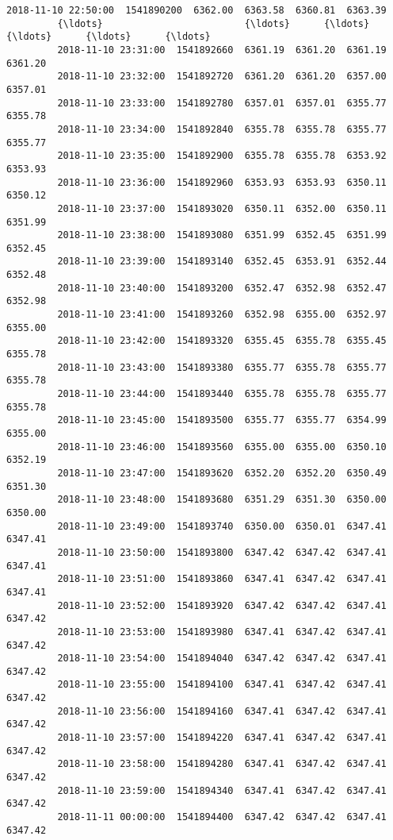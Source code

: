 \documentclass[11pt]{article}
\begin{document}
\begin{Verbatim}[commandchars=\\\{\}]
         2018-11-10 22:50:00  1541890200  6362.00  6363.58  6360.81  6363.39   
         {\ldots}                         {\ldots}      {\ldots}      {\ldots}      {\ldots}      {\ldots}   
         2018-11-10 23:31:00  1541892660  6361.19  6361.20  6361.19  6361.20   
         2018-11-10 23:32:00  1541892720  6361.20  6361.20  6357.00  6357.01   
         2018-11-10 23:33:00  1541892780  6357.01  6357.01  6355.77  6355.78   
         2018-11-10 23:34:00  1541892840  6355.78  6355.78  6355.77  6355.77   
         2018-11-10 23:35:00  1541892900  6355.78  6355.78  6353.92  6353.93   
         2018-11-10 23:36:00  1541892960  6353.93  6353.93  6350.11  6350.12   
         2018-11-10 23:37:00  1541893020  6350.11  6352.00  6350.11  6351.99   
         2018-11-10 23:38:00  1541893080  6351.99  6352.45  6351.99  6352.45   
         2018-11-10 23:39:00  1541893140  6352.45  6353.91  6352.44  6352.48   
         2018-11-10 23:40:00  1541893200  6352.47  6352.98  6352.47  6352.98   
         2018-11-10 23:41:00  1541893260  6352.98  6355.00  6352.97  6355.00   
         2018-11-10 23:42:00  1541893320  6355.45  6355.78  6355.45  6355.78   
         2018-11-10 23:43:00  1541893380  6355.77  6355.78  6355.77  6355.78   
         2018-11-10 23:44:00  1541893440  6355.78  6355.78  6355.77  6355.78   
         2018-11-10 23:45:00  1541893500  6355.77  6355.77  6354.99  6355.00   
         2018-11-10 23:46:00  1541893560  6355.00  6355.00  6350.10  6352.19   
         2018-11-10 23:47:00  1541893620  6352.20  6352.20  6350.49  6351.30   
         2018-11-10 23:48:00  1541893680  6351.29  6351.30  6350.00  6350.00   
         2018-11-10 23:49:00  1541893740  6350.00  6350.01  6347.41  6347.41   
         2018-11-10 23:50:00  1541893800  6347.42  6347.42  6347.41  6347.41   
         2018-11-10 23:51:00  1541893860  6347.41  6347.42  6347.41  6347.41   
         2018-11-10 23:52:00  1541893920  6347.42  6347.42  6347.41  6347.42   
         2018-11-10 23:53:00  1541893980  6347.41  6347.42  6347.41  6347.42   
         2018-11-10 23:54:00  1541894040  6347.42  6347.42  6347.41  6347.42   
         2018-11-10 23:55:00  1541894100  6347.41  6347.42  6347.41  6347.42   
         2018-11-10 23:56:00  1541894160  6347.41  6347.42  6347.41  6347.42   
         2018-11-10 23:57:00  1541894220  6347.41  6347.42  6347.41  6347.42   
         2018-11-10 23:58:00  1541894280  6347.41  6347.42  6347.41  6347.42   
         2018-11-10 23:59:00  1541894340  6347.41  6347.42  6347.41  6347.42   
         2018-11-11 00:00:00  1541894400  6347.42  6347.42  6347.41  6347.42   
         

\end{Verbatim}
\end{document}
